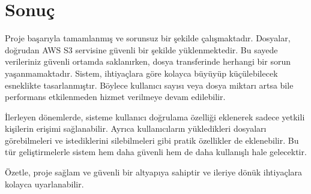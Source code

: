 \section{Sonuç}

Proje başarıyla tamamlanmış ve sorunsuz bir şekilde çalışmaktadır. Dosyalar, doğrudan AWS S3 servisine güvenli bir şekilde yüklenmektedir. Bu sayede verileriniz güvenli ortamda saklanırken, dosya transferinde herhangi bir sorun yaşanmamaktadır. Sistem, ihtiyaçlara göre kolayca büyüyüp küçülebilecek esneklikte tasarlanmıştır. Böylece kullanıcı sayısı veya dosya miktarı artsa bile performans etkilenmeden hizmet verilmeye devam edilebilir.

İlerleyen dönemlerde, sisteme kullanıcı doğrulama özelliği eklenerek sadece yetkili kişilerin erişimi sağlanabilir. Ayrıca kullanıcıların yükledikleri dosyaları görebilmeleri ve istediklerini silebilmeleri gibi pratik özellikler de eklenebilir. Bu tür geliştirmelerle sistem hem daha güvenli hem de daha kullanışlı hale gelecektir.

Özetle, proje sağlam ve güvenli bir altyapıya sahiptir ve ileriye dönük ihtiyaçlara kolayca uyarlanabilir.



